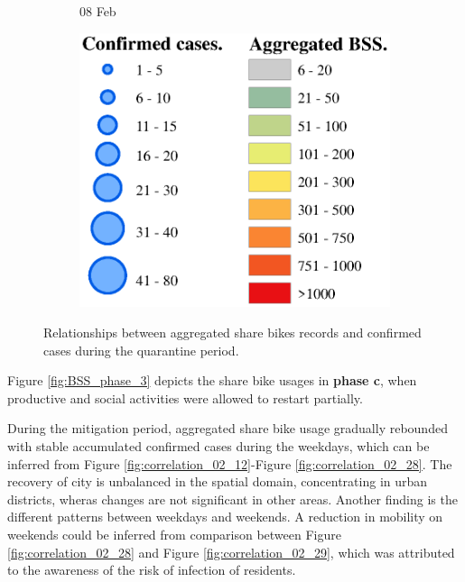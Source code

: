 \documentclass[preprints,ijgi,submit,moreauthors]{Definitions/mdpi}
\begin{document}
\begin{figure}[ht]
\begin{subfigure}{.3\textwidth}
        \caption{08 Feb}
    \end{subfigure}
    \begin{subfigure}{.3\textwidth}
        \includegraphics[width=\textwidth]{Figures/Relation_with_confrimed_cases/legend7.eps}
    \end{subfigure}
    \caption{Relationships between aggregated share bikes records and confirmed cases during the quarantine period.}
    \label{fig:BSS_phase1_2}
\end{figure}

Figure \ref{fig:BSS_phase_3} depicts the share bike usages in \textbf{phase c}, when productive and social activities were allowed to restart partially.

During the mitigation period, aggregated share bike usage gradually rebounded with stable accumulated confirmed cases during the weekdays, which can be inferred from Figure \ref{fig:correlation_02_12}-Figure \ref{fig:correlation_02_28}.
The recovery of city is unbalanced in the spatial domain, concentrating in urban districts, wheras changes are not significant in other areas.
Another finding is the different patterns between weekdays and weekends.
A reduction in mobility on weekends could be inferred from comparison between Figure \ref{fig:correlation_02_28} and Figure \ref{fig:correlation_02_29}, which was attributed to the awareness of the risk of infection of residents.
\end{document}

